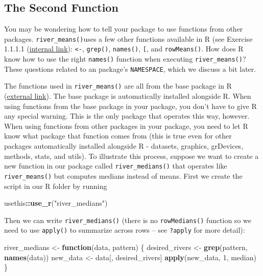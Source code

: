 \documentclass[
]{book}
\newenvironment{Shaded}{\begin{snugshade}}{\end{snugshade}}
\newcommand{\ControlFlowTok}[1]{\textcolor[rgb]{0.13,0.29,0.53}{\textbf{#1}}}
\newcommand{\DecValTok}[1]{\textcolor[rgb]{0.00,0.00,0.81}{#1}}
\newcommand{\KeywordTok}[1]{\textcolor[rgb]{0.13,0.29,0.53}{\textbf{#1}}}
\newcommand{\NormalTok}[1]{#1}
\newcommand{\OperatorTok}[1]{\textcolor[rgb]{0.81,0.36,0.00}{\textbf{#1}}}
\newcommand{\StringTok}[1]{\textcolor[rgb]{0.31,0.60,0.02}{#1}}
\begin{document}
\hypertarget{second-function}{%
\subsection{The Second Function}\label{second-function}}

You may be wondering how to tell your package to use functions from other packages. \texttt{river\_means()}uses a few other functions available in R (see Exercise 1.1.1.1 (\protect\hyperlink{ex-set1}{internal link}): \texttt{\textless{}-}, \texttt{grep()}, \texttt{names()}, \texttt{{[}}, and \texttt{rowMeans()}. How does R know how to use the right \texttt{names()} function when executing \texttt{river\_means()}? These questions related to an package's \texttt{NAMESPACE}, which we discuss a bit later.

The functions used in \texttt{river\_means()} are all from the base package in R (\href{https://stat.ethz.ch/R-manual/R-devel/library/base/html/00Index.html}{external link}). The base package is automatically installed alongside R. When using functions from the base package in your package, you don't have to give R any special warning. This is the only package that operates this way, however. When using functions from other packages in your package, you need to let R know what package that function comes from (this is true even for other packages automatically installed alongside R - datasets, graphics, grDevices, methods, stats, and utils). To illustrate this process, suppose we want to create a new function in our package called \texttt{river\_medians()} that operates like \texttt{river\_means()} but computes medians instead of means. First we create the script in our R folder by running

\begin{Shaded}
\begin{Highlighting}[]
\NormalTok{usethis}\OperatorTok{::}\KeywordTok{use_r}\NormalTok{(}\StringTok{"river_medians"}\NormalTok{)}
\end{Highlighting}
\end{Shaded}

Then we can write \texttt{river\_medians()} (there is no \texttt{rowMedians()} function so we need to use \texttt{apply()} to summarize across rows -- see \texttt{?apply} for more detail):

\begin{Shaded}
\begin{Highlighting}[]
\NormalTok{river_medians <-}\StringTok{ }\ControlFlowTok{function}\NormalTok{(data, pattern) \{}
\NormalTok{  desired_rivers <-}\StringTok{ }\KeywordTok{grep}\NormalTok{(pattern, }\KeywordTok{names}\NormalTok{(data))}
\NormalTok{  new_data <-}\StringTok{ }\NormalTok{data[, desired_rivers]}
  \KeywordTok{apply}\NormalTok{(new_data, }\DecValTok{1}\NormalTok{, median)}
\NormalTok{\}}
\end{Highlighting}
\end{Shaded}
\end{document}
